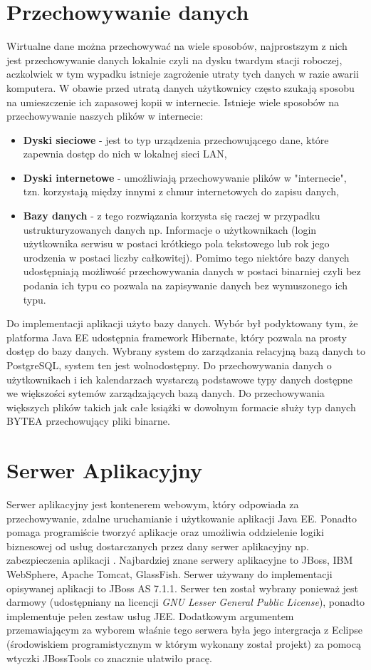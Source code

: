 \section{Przechowywanie danych}
\label{sec:bazadanych}
Wirtualne dane można przechowywać na wiele sposobów, najprostszym z nich jest przechowywanie danych lokalnie czyli na dysku twardym stacji roboczej, aczkolwiek w tym wypadku istnieje zagrożenie utraty tych danych w razie awarii komputera. W obawie przed utratą danych użytkownicy często szukają sposobu na umieszczenie ich zapasowej kopii w internecie. Istnieje wiele sposobów na przechowywanie naszych plików w internecie:
\begin{itemize}
	\item \textbf{Dyski sieciowe} - jest to typ urządzenia przechowującego dane, które zapewnia dostęp do nich w lokalnej sieci LAN,
	\item \textbf{Dyski internetowe} - umożliwiają przechowywanie plików w "internecie", tzn. korzystają między innymi z chmur internetowych do zapisu danych,
	\item \textbf{Bazy danych} - z tego rozwiązania korzysta się raczej w przypadku ustrukturyzowanych danych np. Informacje o użytkownikach (login użytkownika serwisu w postaci krótkiego pola tekstowego lub rok jego urodzenia w postaci liczby całkowitej). Pomimo tego niektóre bazy danych udostępniają możliwość przechowywania danych w postaci binarniej czyli bez podania ich typu co pozwala na zapisywanie danych bez wymuszonego ich typu.  
\end{itemize}

Do implementacji aplikacji użyto bazy danych. Wybór był podyktowany tym, że platforma Java EE udostępnia framework Hibernate, który pozwala na prosty dostęp do bazy danych. Wybrany system do zarządzania relacyjną bazą danych to PostgreSQL, system ten jest wolnodostępny. Do przechowywania danych o użytkownikach i ich kalendarzach wystarczą podstawowe typy danych dostępne we większości sytemów zarządzających bazą danych. Do przechowywania większych plików takich jak całe książki w dowolnym formacie służy typ danych BYTEA przechowujący pliki binarne.
\section{Serwer Aplikacyjny}
\label{sec:serweraplikacyjny}
Serwer aplikacyjny jest kontenerem webowym, który odpowiada za przechowywanie, zdalne uruchamianie i użytkowanie aplikacji Java EE. Ponadto pomaga programiście tworzyć aplikacje oraz umożliwia oddzielenie logiki biznesowej od usług dostarczanych przez dany serwer aplikacyjny np. zabezpieczenia aplikacji \cite{SA01}. Najbardziej znane serwery aplikacyjne to JBoss, IBM WebSphere, Apache Tomcat, GlassFish. Serwer używany do implementacji opisywanej aplikacji to JBoss AS 7.1.1. Serwer ten został wybrany ponieważ jest darmowy (udostępniany na licencji \textit{GNU Lesser General Public License}), ponadto implementuje pełen zestaw usług JEE. Dodatkowym argumentem przemawiającym za wyborem właśnie tego serwera była jego intergracja z Eclipse (środowiskiem programistycznym w którym wykonany został projekt) za pomocą wtyczki JBossTools co znacznie ułatwiło pracę. 
